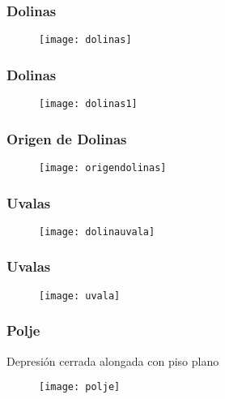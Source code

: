 \documentclass{beamer}
\begin{document}
\begin{frame}
\frametitle{Dolinas}
\begin{figure}
\begin{center}
   	\texttt{[image: dolinas]}
\end{center}
\end{figure}
\end{frame}
\begin{frame}
\frametitle{Dolinas}
\begin{figure}
\begin{center}
   	\texttt{[image: dolinas1]}
\end{center}
\end{figure}
\end{frame}
\begin{frame}
\frametitle{Origen de Dolinas}
\begin{figure}
\begin{center}
   	\texttt{[image: origendolinas]}
\end{center}
\end{figure}
\end{frame}
\begin{frame}
\frametitle{Uvalas}
\begin{figure}
\begin{center}
   	\texttt{[image: dolinauvala]}
\end{center}
\end{figure}
\end{frame}
\begin{frame}
\frametitle{Uvalas}
\begin{figure}
\begin{center}
   	\texttt{[image: uvala]}
\end{center}
\end{figure}
\end{frame}
\begin{frame}
\frametitle{Polje}
\small{Depresión cerrada alongada con piso plano}
\begin{figure}
\begin{center}
   	\texttt{[image: polje]}
\end{center}
\end{figure}
\end{frame}
\end{document}
